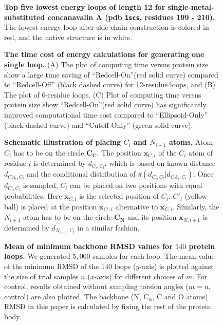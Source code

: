 
\begin{figure}[!hp]
  \caption{{\bf Top five lowest energy loops of length 12 for single-metal-substituted concanavalin A (pdb {\tt 1scs}, residues 199 - 210).}
   The lowest energy loop after side-chain construction is colored in red, and the native structure is in white.
  \label{fig:pdb}}
\end{figure}
\begin{figure}[!hp]
  \caption{{\bf The time cost of energy calculations for generating one single loop.}
  (A) The plot of computing time versus protein size show a large time saving of ``{\sc Redcell}-On''(red solid curve) compared to ``{\sc Redcell}-Off'' (black dashed curve) for 12-residue
  loops, and (B) The plot of 6-residue loops. (C) Plot of computing time versus protein size show ``{\sc Redcell}-On''(red solid curve) has significantly improved
computational time cost compared to ``Ellipsoid-Only'' (black dashed
curve) and ``Cutoff-Only'' (green solid curve).
  \label{fig:ellipresult}}
\end{figure}
\begin{figure}[!hp]
  \caption{ {\bf Schematic illustration of placing $C_i$ and $N_{i+1}$ atoms.} Atom $C_{i}$ has to be on the
circle $\mathbf{C_C}$. The position $\mathbf{x}_{C,i}$ of the $C_i$
atom of residue $i$ is determined by $d_{C_i,C_l}$, which is based
on known distance $d_{CA_i,C_l}$ and the conditional distribution of
$\pi(d_{C_i,C_l} | d_{CA_i,C_l})$. Once $d_{C_i, C_l}$ is sampled,
$C_i$ can be placed on two positions with equal probabilities. Here
$\mathbf{x}_{C, i}$ is the selected position of $C_i$. $C'_i$
(yellow ball) is placed at the position $\mathbf{x}_{C', i}$
alternative to $\mathbf{x}_{C, i}$. Similarly, the $N_{i+1}$ atom
has to be on the circle $\mathbf{C_N}$ and its position
$\mathbf{x}_{N, i+1}$ is determined by $d_{N_{i+1},C_l}$ in a
similar fashion.
  \label{fig:phi-psi} }
\end{figure}
\begin{figure}[!hp]
  \caption{{\bf Mean of minimum backbone RMSD values for $140$ protein loops.} We generated $5,000$ samples for each loop. The mean value of
    the minimum RMSD of the $140$ loops ($y$-axis) is plotted against
    the size of trial samples $n$ ($x$-axis) for different choices of
    $m$. For control, results obtained without sampling torsion
    angles ($m=n$, control) are also plotted. The backbone (N, $\mathrm{C_{\alpha}}$,
    C and O atoms) RMSD in this paper is calculated by fixing the rest of the protein body.
  \label{fig:statechoose}}
\end{figure}
